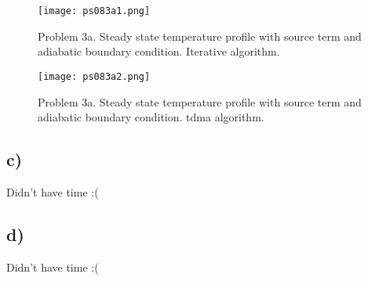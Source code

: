 \documentclass{article}
\begin{document}
\begin{figure}
\texttt{[image: ps083a1.png]}
\caption{Problem 3a. Steady state temperature profile with source term and adiabatic boundary condition. Iterative algorithm.}
\label{fig:3a1}
\end{figure}

\begin{figure}
\texttt{[image: ps083a2.png]}
\caption{Problem 3a. Steady state temperature profile with source term and adiabatic boundary condition. tdma algorithm.}
\label{fig:3a2}
\end{figure}

\subsection{c)}
Didn't have time :(

\subsection{d)}
Didn't have time :(

\newpage


\end{document}

